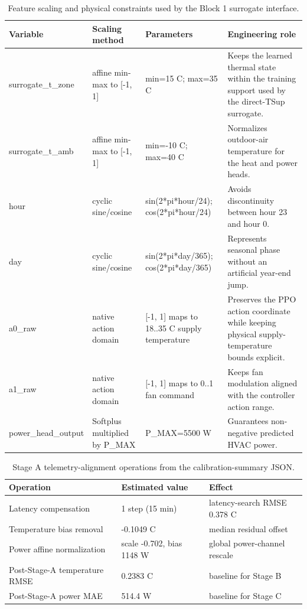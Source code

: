 \documentclass[11pt,a4paper]{article}
\begin{document}
\begin{table}[pos={!ht}]
\centering
\scriptsize
\caption{Feature scaling and physical constraints used by the Block 1 surrogate interface.}
\label{tab:v3-scaling}
\begin{tabularx}{\linewidth}{lXXX}
\toprule
Variable & Scaling method & Parameters & Engineering role \\
\midrule
surrogate\_t\_zone & affine min-max to [-1, 1] & min=15 C; max=35 C & Keeps the learned thermal state within the training support used by the direct-TSup surrogate. \\
surrogate\_t\_amb & affine min-max to [-1, 1] & min=-10 C; max=40 C & Normalizes outdoor-air temperature for the heat and power heads. \\
hour & cyclic sine/cosine & sin(2*pi*hour/24); cos(2*pi*hour/24) & Avoids discontinuity between hour 23 and hour 0. \\
day & cyclic sine/cosine & sin(2*pi*day/365); cos(2*pi*day/365) & Represents seasonal phase without an artificial year-end jump. \\
a0\_raw & native action domain & [-1, 1] maps to 18..35 C supply temperature & Preserves the PPO action coordinate while keeping physical supply-temperature bounds explicit. \\
a1\_raw & native action domain & [-1, 1] maps to 0..1 fan command & Keeps fan modulation aligned with the controller action range. \\
power\_head\_output & Softplus multiplied by P\_MAX & P\_MAX=5500 W & Guarantees non-negative predicted HVAC power. \\
\bottomrule
\end{tabularx}
\end{table}

\begin{table}[pos={!ht}]
\centering
\small
\caption{Stage A telemetry-alignment operations from the calibration-summary JSON.}
\label{tab:stage-a}
\begin{tabularx}{\linewidth}{llX}
\toprule
Operation & Estimated value & Effect \\
\midrule
Latency compensation & 1 step (15 min) & latency-search RMSE 0.378 C \\
Temperature bias removal & -0.1049 C & median residual offset \\
Power affine normalization & scale -0.702, bias 1148 W & global power-channel rescale \\
Post-Stage-A temperature RMSE & 0.2383 C & baseline for Stage B \\
Post-Stage-A power MAE & 514.4 W & baseline for Stage C \\
\bottomrule
\end{tabularx}
\end{table}
\end{document}
